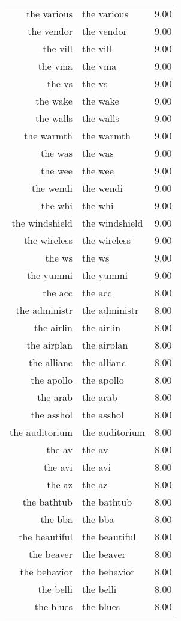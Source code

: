 \begin{table}[ht]
\begin{tabular}{rlr}
  the various & the various & 9.00 \\ 
  the vendor & the vendor & 9.00 \\ 
  the vill & the vill & 9.00 \\ 
  the vma & the vma & 9.00 \\ 
  the vs & the vs & 9.00 \\ 
  the wake & the wake & 9.00 \\ 
  the walls & the walls & 9.00 \\ 
  the warmth & the warmth & 9.00 \\ 
  the was & the was & 9.00 \\ 
  the wee & the wee & 9.00 \\ 
  the wendi & the wendi & 9.00 \\ 
  the whi & the whi & 9.00 \\ 
  the windshield & the windshield & 9.00 \\ 
  the wireless & the wireless & 9.00 \\ 
  the ws & the ws & 9.00 \\ 
  the yummi & the yummi & 9.00 \\ 
  the acc & the acc & 8.00 \\ 
  the administr & the administr & 8.00 \\ 
  the airlin & the airlin & 8.00 \\ 
  the airplan & the airplan & 8.00 \\ 
  the allianc & the allianc & 8.00 \\ 
  the apollo & the apollo & 8.00 \\ 
  the arab & the arab & 8.00 \\ 
  the asshol & the asshol & 8.00 \\ 
  the auditorium & the auditorium & 8.00 \\ 
  the av & the av & 8.00 \\ 
  the avi & the avi & 8.00 \\ 
  the az & the az & 8.00 \\ 
  the bathtub & the bathtub & 8.00 \\ 
  the bba & the bba & 8.00 \\ 
  the beautiful & the beautiful & 8.00 \\ 
  the beaver & the beaver & 8.00 \\ 
  the behavior & the behavior & 8.00 \\ 
  the belli & the belli & 8.00 \\ 
  the blues & the blues & 8.00 \\ 

\end{tabular}
\end{table}
